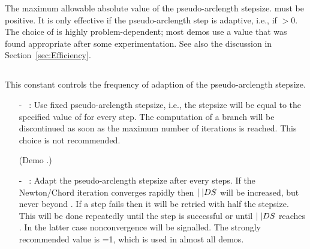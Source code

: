  The maximum allowable absolute value of the pseudo-arclength stepsize.
  must be positive.
 It is only effective if the pseudo-arclength step is adaptive,
 i.e., if $>$0.
 The choice of  is highly problem-dependent; 
 most demos use a value that was found appropriate after some
 experimentation.
 See also the discussion in Section~\ref{sec:Efficiency}.

\subsection{}  \label{sec:IADS}


This constant controls the frequency of adaption of the 
pseudo-arclength stepsize.
\begin{itemize}
\item[-] ~: 
  Use fixed pseudo-arclength stepsize, i.e., the stepsize will
  be equal to the specified value of  for every step.
  The computation of a branch will be discontinued as soon as
  the maximum number of iterations  is reached.
  This choice is not recommended. 

(Demo .)
\item[-] ~:  
 Adapt the pseudo-arclength stepsize after every  steps.
  If the Newton/Chord iteration converges rapidly then 
  $\mid{\tt \mid}{ DS}$ will be increased, but never beyond .
  If a step fails then it will be retried with half
  the stepsize. This will be done repeatedly until the
  step is successful or until $\mid{\tt \mid}{ DS}$ reaches . 
  In the latter case nonconvergence will be signalled.
  The strongly recommended value is =1, which is used in 
  almost all demos.
\end{itemize}
  
